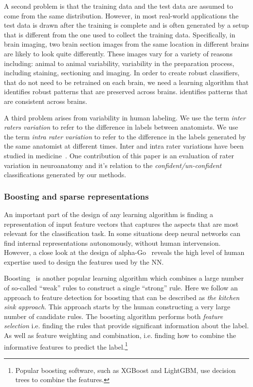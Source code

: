 \documentclass[11pt]{article}
\begin{document}
A second problem is that the training data and the test data are assumed to
come from the same distribution. However, in most real-world
applications the test data is drawn after the training is complete and
is often generated by a setup that is different from the one used to
collect the training data.
Specifically, in brain imaging, two brain section images from the same
location in different brains are likely to look quite differently.
These images vary for a variety of reasons including: animal to animal variability,
variability in the preparation process, including staining,
sectioning and imaging. In order to create robust classifiers, that do
not need to be retrained on each brain, we need a learning algorithm
that identifies robust patterns that are preserved across brains.
identifies patterns that are consistent across brains.

A third problem arises from variability in human labeling. We use
the term {\em inter raters variation} to refer to the difference in
labels between anatomists. We use the term {\em intra rater
  variation} to refer to the difference in the labels generated by the
same anatomist at different times. Inter and intra rater variations
have been studied in medicine~\cite{gellhorn2013inter}. One
contribution of this paper is an evaluation of rater variation in
neuroanatomy and it's relation to the {\em confident/un-confident}
classifications generated by our methods.

\subsubsection{Boosting and sparse representations}
An important part of the design of any learning algorithm is finding a
representation of input feature vectors that captures the aspects that are
most relevant for the classification task. In some situations deep
neural networks can find internal representations autonomously,
without human intervension. However, a close look at the design of
alpha-Go~\cite{silver2017mastering} reveals the high level of human
expertise used to design the features used by the NN.

Boosting~\cite{FreundSc97,schapire2013boosting} is another popular
learning algorithm which combines a large number of so-called ``weak''
rules to construct a single ``strong'' rule. Here we follow an
approach to feature detection for boosting that can be described as
{\em the kitchen sink approach}. This approach starts by the human
constructing a very large number of candidate rules. The boosting
algorithm performs both {\em feature selection} i.e. finding the rules
that provide significant information about the label. As well as feature weighting and
combination, i.e. finding how to combine the informative features to
predict the label.\footnote{Popular boosting software, such as XGBoost and
  LightGBM, use decision trees to combine the features.}
\end{document}
